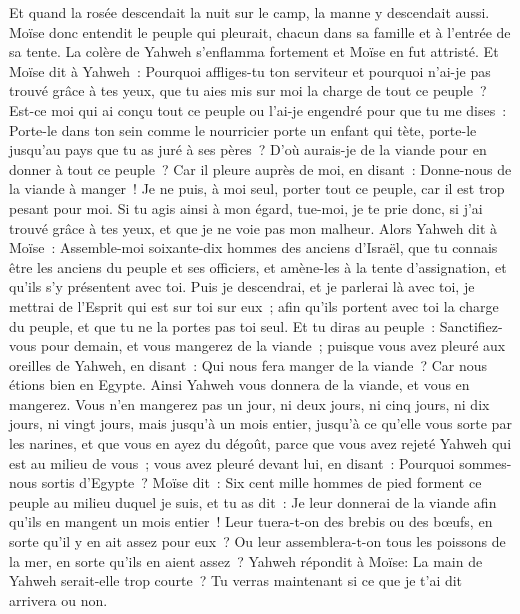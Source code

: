 \begin{multicols}{2}
Et quand la rosée descendait la nuit sur le camp, la manne y descendait aussi.
Moïse donc entendit le peuple qui pleurait, chacun dans sa famille et à l'entrée de sa tente. La colère de Yahweh s'enflamma fortement et Moïse en fut attristé.
Et Moïse dit à Yahweh~: Pourquoi affliges-tu ton serviteur et pourquoi n'ai-je pas trouvé grâce à tes yeux, que tu aies mis sur moi la charge de tout ce peuple~?
Est-ce moi qui ai conçu tout ce peuple ou l'ai-je engendré pour que tu me dises~: Porte-le dans ton sein comme le nourricier porte un enfant qui tète, porte-le jusqu'au pays que tu as juré à ses pères~?
D'où aurais-je de la viande pour en donner à tout ce peuple~? Car il pleure auprès de moi, en disant~: Donne-nous de la viande à manger~!
Je ne puis, à moi seul, porter tout ce peuple, car il est trop pesant pour moi.
Si tu agis ainsi à mon égard, tue-moi, je te prie donc, si j'ai trouvé grâce à tes yeux, et que je ne voie pas mon malheur.
Alors Yahweh dit à Moïse~: Assemble-moi soixante-dix hommes des anciens d'Israël, que tu connais être les anciens du peuple et ses officiers, et amène-les à la tente d'assignation, et qu'ils s'y présentent avec toi.
Puis je descendrai, et je parlerai là avec toi, je mettrai de l'Esprit qui est sur toi sur eux~; afin qu'ils portent avec toi la charge du peuple, et que tu ne la portes pas toi seul.
Et tu diras au peuple~: Sanctifiez-vous pour demain, et vous mangerez de la viande~; puisque vous avez pleuré aux oreilles de Yahweh, en disant~: Qui nous fera manger de la viande~? Car nous étions bien en Egypte. Ainsi Yahweh vous donnera de la viande, et vous en mangerez.
Vous n'en mangerez pas un jour, ni deux jours, ni cinq jours, ni dix jours, ni vingt jours,
mais jusqu'à un mois entier, jusqu'à ce qu'elle vous sorte par les narines, et que vous en ayez du dégoût, parce que vous avez rejeté Yahweh qui est au milieu de vous~; vous avez pleuré devant lui, en disant~: Pourquoi sommes-nous sortis d'Egypte~?
Moïse dit~: Six cent mille hommes de pied forment ce peuple au milieu duquel je suis, et tu as dit~: Je leur donnerai de la viande afin qu'ils en mangent un mois entier~!
Leur tuera-t-on des brebis ou des bœufs, en sorte qu'il y en ait assez pour eux~? Ou leur assemblera-t-on tous les poissons de la mer, en sorte qu'ils en aient assez~?
Yahweh répondit à Moïse: La main de Yahweh serait-elle trop courte~? Tu verras maintenant si ce que je t'ai dit arrivera ou non.

\end{multicols}
